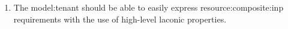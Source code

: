 
\begin{enumerate}[
    label=\textbf{NFR\arabic*},
    leftmargin=*,
    labelindent=1em
]
    \item \label{requirements:model:tenant:verbosity}
    The \gls{model:tenant} should be able to easily express \gls{resource:composite:inp} requirements with the use of high-level laconic properties.
\end{enumerate}